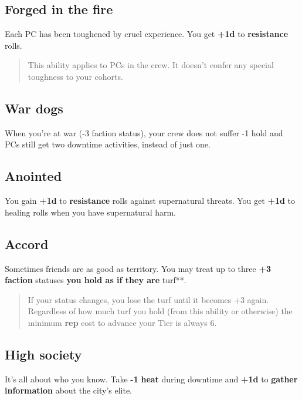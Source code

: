 \documentclass[11pt,oneside]{book}
\newcommand{\gameterm}[1]{\textbf{#1}}
\begin{document}
\subsection{Forged in the fire}

Each PC has been toughened by cruel experience. You get \textbf{+1d} to \textbf{resistance} rolls.

\begin{quote}
	This ability applies to PCs in the crew. It doesn’t confer any special toughness to your cohorts.
\end{quote} 

\subsection{War dogs}

When you’re at war (-3 faction status), your crew does not suffer -1 hold and PCs still get two downtime activities, instead of just one.

\subsection{Anointed}

You gain \textbf{+1d} to \textbf{resistance} rolls against supernatural threats. You get \textbf{+1d} to healing rolls when you have supernatural harm.

\subsection{Accord}

Sometimes friends are as good as territory. You may treat up to three \textbf{+3 faction} statuses\textbf{ you hold as if they are }turf**.

\begin{quote}
	If your status changes, you lose the turf until it becomes +3 again. Regardless of how much turf you hold (from this ability or otherwise) the minimum \gameterm{rep}  cost to advance your Tier is always 6.
\end{quote} 

\subsection{High society}

It’s all about who you know. Take \textbf{-1 }\gameterm{heat} \textbf{ }during downtime and \textbf{+1d} to \textbf{gather information} about the city’s elite.
\end{document}
